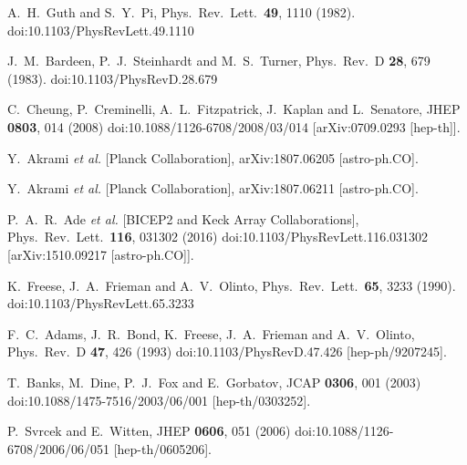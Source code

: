\documentclass[12pt]{article}
\begin{document}
\begin{thebibliography}{99}
  A.~H.~Guth and S.~Y.~Pi,
  Phys.\ Rev.\ Lett.\  {\bf 49}, 1110 (1982).
  doi:10.1103/PhysRevLett.49.1110

  J.~M.~Bardeen, P.~J.~Steinhardt and M.~S.~Turner,
  Phys.\ Rev.\ D {\bf 28}, 679 (1983).
  doi:10.1103/PhysRevD.28.679

  C.~Cheung, P.~Creminelli, A.~L.~Fitzpatrick, J.~Kaplan and L.~Senatore,
  JHEP {\bf 0803}, 014 (2008)
  doi:10.1088/1126-6708/2008/03/014
  [arXiv:0709.0293 [hep-th]].

  Y.~Akrami {\it et al.} [Planck Collaboration],
  arXiv:1807.06205 [astro-ph.CO].

  Y.~Akrami {\it et al.} [Planck Collaboration],
  arXiv:1807.06211 [astro-ph.CO].

  P.~A.~R.~Ade {\it et al.} [BICEP2 and Keck Array Collaborations],
  Phys.\ Rev.\ Lett.\  {\bf 116}, 031302 (2016)
  doi:10.1103/PhysRevLett.116.031302
  [arXiv:1510.09217 [astro-ph.CO]].

  K.~Freese, J.~A.~Frieman and A.~V.~Olinto,
  Phys.\ Rev.\ Lett.\  {\bf 65}, 3233 (1990).
  doi:10.1103/PhysRevLett.65.3233

  F.~C.~Adams, J.~R.~Bond, K.~Freese, J.~A.~Frieman and A.~V.~Olinto,
  Phys.\ Rev.\ D {\bf 47}, 426 (1993)
  doi:10.1103/PhysRevD.47.426
  [hep-ph/9207245].

  T.~Banks, M.~Dine, P.~J.~Fox and E.~Gorbatov,
  JCAP {\bf 0306}, 001 (2003)
  doi:10.1088/1475-7516/2003/06/001
  [hep-th/0303252].

  P.~Svrcek and E.~Witten,
  JHEP {\bf 0606}, 051 (2006)
  doi:10.1088/1126-6708/2006/06/051
  [hep-th/0605206].


\end{thebibliography}
\end{document}
